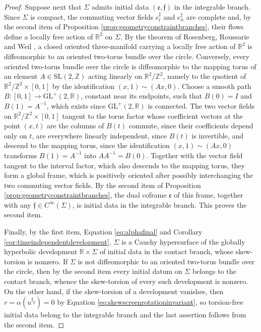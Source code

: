 \documentclass[10pt,reqno,a4paper]{amsart}
\theoremstyle{plain}
\theoremstyle{definition}
\theoremstyle{remark}
\theoremstyle{remark}
\def\fre{\mathfrak{e}}
\renewcommand{\(}{ (}
\renewcommand{\)}{ )}
\newcommand{\frf}{\mathfrak{f}}
\begin{document}
\begin{proof}
\noindent
Suppose next that $\Sigma$ admits initial data $(\fre,\frf)$ in the integrable branch. Since $\Sigma$ is compact, the commuting vector fields $e^{\sharp}_{l}$ and $e^{\sharp}_{n}$ are complete and, by the second item of Proposition \ref{prop:geometryconstraintbranches}, their flows define a locally free action of $\mathbb{R}^2$ on $\Sigma$. By the theorem of Rosenberg, Roussarie and Weil \cite{RosenbergRoussarieWeil}, a closed oriented three-manifold carrying a locally free action of $\mathbb{R}^2$ is diffeomorphic to an oriented two-torus bundle over the circle. Conversely, every oriented two-torus bundle over the circle is diffeomorphic to the mapping torus of an element $A\in\mathrm{SL}(2,\mathbb{Z})$ acting linearly on $\mathbb{R}^2/\mathbb{Z}^2$, namely to the quotient of $\mathbb{R}^2/\mathbb{Z}^2\times [0,1]$ by the identification $(x,1)\sim(Ax,0)$. Choose a smooth path $B\colon[0,1]\to\mathrm{GL}^+(2,\mathbb{R})$, constant near its endpoints, such that $B(0)=I$ and $B(1)=A^{-1}$, which exists since $\mathrm{GL}^+(2,\mathbb{R})$ is connected. The two vector fields on $\mathbb{R}^2/\mathbb{Z}^2\times [0,1]$ tangent to the torus factor whose coefficient vectors at the point $(x,t)$ are the columns of $B(t)$ commute, since their coefficients depend only on $t$, are everywhere linearly independent, since $B(t)$ is invertible, and descend to the mapping torus, since the identification $(x,1)\sim(Ax,0)$ transforms $B(1) = A^{-1}$ into $AA^{-1} = B(0)$. Together with the vector field tangent to the interval factor, which also descends to the mapping torus, they form a global frame, which is positively oriented after possibly interchanging the two commuting vector fields. By the second item of Proposition \ref{prop:geometryconstraintbranches}, the dual coframe $\fre$ of this frame, together with any $\frf\in C^{\infty}(\Sigma)$, is initial data in the integrable branch. This proves the second item.

\noindent
Finally, by the first item, Equation \eqref{eq:alphafinal} and Corollary \ref{cor:timeindependentdevelopment}, $\Sigma$ is a Cauchy hypersurface of the globally hyperbolic development $\mathbb{R}\times\Sigma$ of initial data in the contact branch, whose skew-torsion is nonzero. If $\Sigma$ is not diffeomorphic to an oriented two-torus bundle over the circle, then by the second item every initial datum on $\Sigma$ belongs to the contact branch, whence the skew-torsion of every such development is nonzero. On the other hand, if the skew-torsion of a development vanishes, then $r = \alpha(u^{\sharp_g}) = 0$ by Equation \eqref{eq:skewscreenrotationinvariant}, so torsion-free initial data belong to the integrable branch and the last assertion follows from the second item.
\end{proof}
\end{document}
